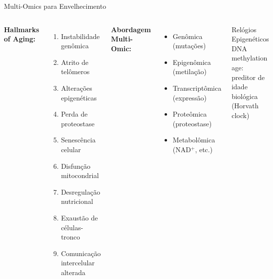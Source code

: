 \begin{frame}{Multi-Omics para Envelhecimento}
\begin{columns}
\textbf{Hallmarks of Aging:}
\begin{enumerate}\small
    \item Instabilidade genômica
    \item Atrito de telômeros
    \item Alterações epigenéticas
    \item Perda de proteostase
    \item Senescência celular
    \item Disfunção mitocondrial
    \item Desregulação nutricional
    \item Exaustão de células-tronco
    \item Comunicação intercelular alterada
\end{enumerate}

\textbf{Abordagem Multi-Omic:}
\begin{itemize}
    \item Genômica (mutações)
    \item Epigenômica (metilação)
    \item Transcriptômica (expressão)
    \item Proteômica (proteostase)
    \item Metabolômica (NAD$^+$, etc.)
\end{itemize}

\vspace{0.3cm}

\begin{alertblock}{Relógios Epigenéticos}
DNA methylation age: preditor de idade biológica (Horvath clock)
\end{alertblock}
\end{columns}
\end{frame}

